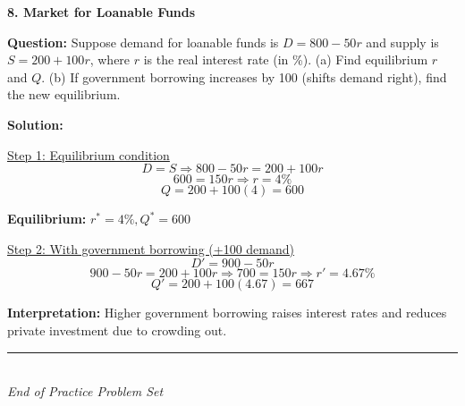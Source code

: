 \documentclass[12pt]{article}
\begin{document}
\newpage

\textbf{8. Market for Loanable Funds}

\textbf{Question:}  
Suppose demand for loanable funds is \( D = 800 - 50r \) and supply is \( S = 200 + 100r \), where \(r\) is the real interest rate (in \%).  
(a) Find equilibrium \(r\) and \(Q\).  
(b) If government borrowing increases by 100 (shifts demand right), find the new equilibrium.

\textbf{Solution:}

\underline{Step 1: Equilibrium condition}
\[
D = S \Rightarrow 800 - 50r = 200 + 100r
\]
\[
600 = 150r \Rightarrow r = 4\%
\]
\[
Q = 200 + 100(4) = 600
\]

\textbf{Equilibrium:} \(r^* = 4\%, Q^* = 600\)

\underline{Step 2: With government borrowing (+100 demand)}
\[
D' = 900 - 50r
\]
\[
900 - 50r = 200 + 100r \Rightarrow 700 = 150r \Rightarrow r' = 4.67\%
\]
\[
Q' = 200 + 100(4.67) = 667
\]

\textbf{Interpretation:}  
Higher government borrowing raises interest rates and reduces private investment due to crowding out.

\begin{center}
\rule{0.5\textwidth}{0.4pt}\\
\textit{End of Practice Problem Set}
\end{center}
\end{document}

